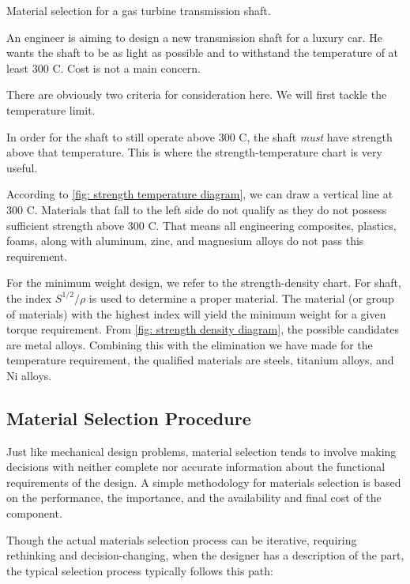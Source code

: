 \documentclass[
10pt,
a4paper,
openany,
svgnames,
]{book}
\begin{document}
\begin{example} Material selection for a gas turbine transmission shaft.

  An engineer is aiming to design a new transmission shaft for a luxury car. He wants the shaft to be as light as possible and to withstand the temperature of at least 300 C. Cost is not a main concern.

\end{example}
\begin{solution}
  There are obviously two criteria for consideration here. We will first tackle the temperature limit.

  In order for the shaft to still operate above 300 C, the shaft \emph{must} have strength above that temperature. This is where the strength-temperature chart is very useful.

  According to \cref{fig: strength temperature diagram}, we can draw a vertical line at 300 C. Materials that fall to the left side do not qualify as they do not possess sufficient strength above 300 C. That means all engineering composites, plastics, foams, along with aluminum, zinc, and magnesium alloys do not pass this requirement.

  For the minimum weight design, we refer to the strength-density chart. For shaft, the index $S^{1/2}/\rho$ is used to determine a proper material. The material (or group of materials) with the highest index will yield the minimum weight for a given torque requirement. From \cref{fig: strength density diagram}, the possible candidates are metal alloys. Combining this with the elimination we have made for the temperature requirement, the qualified materials are steels, titanium alloys, and Ni alloys. 

\end{solution}
\subsection{Material Selection Procedure}

Just like mechanical design problems, material selection tends to involve making decisions with neither complete nor accurate information about the functional requirements of the design. A simple methodology for materials selection is based on the performance, the importance, and the availability and final cost of the component.

Though the actual materials selection process can be iterative, requiring rethinking and decision-changing, when the designer has a description of the part, the typical selection process typically follows this path:
\end{document}
